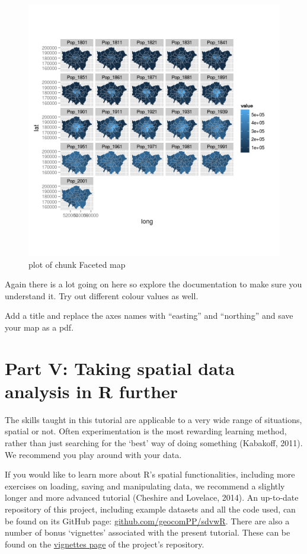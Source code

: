 \documentclass[]{article}
\begin{document}
\begin{figure}[htbp]
\centering
\includegraphics{figure/Faceted_map.png}
\caption{plot of chunk Faceted map}
\end{figure}

Again there is a lot going on here so explore the documentation to make
sure you understand it. Try out different colour values as well.

Add a title and replace the axes names with ``easting'' and ``northing''
and save your map as a pdf.

\section{Part V: Taking spatial data analysis in R
further}\label{part-v-taking-spatial-data-analysis-in-r-further}

The skills taught in this tutorial are applicable to a very wide range
of situations, spatial or not. Often experimentation is the most
rewarding learning method, rather than just searching for the `best' way
of doing something (Kabakoff, 2011). We recommend you play around with
your data.

If you would like to learn more about R's spatial functionalities,
including more exercises on loading, saving and manipulating data, we
recommend a slightly longer and more advanced tutorial (Cheshire and
Lovelace, 2014). An up-to-date repository of this project, including
example datasets and all the code used, can be found on its GitHub page:
\href{https://github.com/geocomPP/sdvwR}{github.com/geocomPP/sdvwR}.
There are also a number of bonus `vignettes' associated with the present
tutorial. These can be found on the
\href{https://github.com/Robinlovelace/Creating-maps-in-R/tree/master/vignettes}{vignettes
page} of the project's repository.
\end{document}
